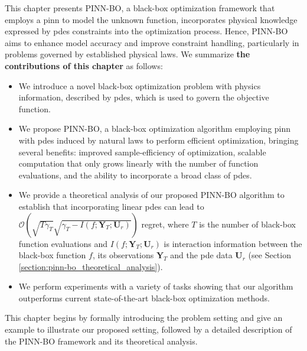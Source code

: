 This chapter presents PINN-BO, a black-box optimization framework that employs a \ac{pinn} to model the unknown function, incorporates physical knowledge expressed by \acp{pde} constraints into the optimization process. Hence, PINN-BO aims to enhance model accuracy and improve constraint handling, particularly in problems governed by established physical laws. We summarize \textbf{the contributions of this chapter} as follows:
\begin{itemize}
    \item We introduce a novel black-box optimization problem with physics information, described by \acfp{pde}, which is used to govern the objective function.
    
    \item We propose PINN-BO, a black-box optimization algorithm employing \acl{pinn} with \acfp{pde} induced by natural laws to perform efficient optimization, bringing several benefits: improved sample-efficiency of optimization, scalable computation that only grows linearly with the number of function evaluations, and the ability to incorporate a broad class of \acp{pde}.
     
    \item We provide a theoretical analysis of our proposed PINN-BO algorithm to establish that incorporating linear \acp{pde} can lead to $\mathcal{O}\left(\sqrt{T\gamma_T}\sqrt{\gamma_T - I (f; \mathbf{Y}_T; \mathbf{U}_r) } \right)$ regret, where $T$ is the number of black-box function evaluations and $I (f; \mathbf{Y}_T; \mathbf{U}_r)$ is interaction information between the black-box function  $f$, its observations $\mathbf{Y}_T$ and the \ac{pde} data $\mathbf{U}_r$ (see Section \ref{section:pinn-bo_theoretical_analysis}).
    
    \item We perform experiments with a variety of tasks showing that our algorithm outperforms current state-of-the-art black-box optimization methods.
\end{itemize} 
This chapter begins by formally introducing the problem setting and give an example to illustrate our proposed setting, followed by a detailed description of the PINN-BO framework and its theoretical analysis.
